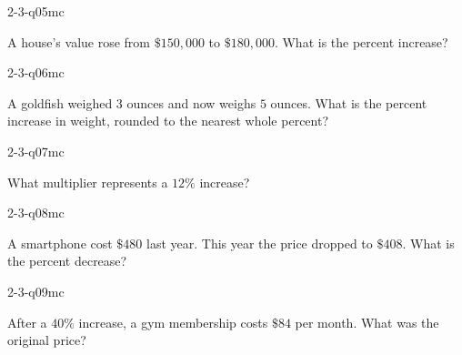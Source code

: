 \begin{practiceQuestion}{2-3-q05}{mc}
\begin{questionText}
A house's value rose from $\$150{,}000$ to $\$180{,}000$. What is the percent increase?
\end{questionText}
\end{practiceQuestion}

\begin{practiceQuestion}{2-3-q06}{mc}
\begin{questionText}
A goldfish weighed $3$ ounces and now weighs $5$ ounces. What is the percent increase in weight, rounded to the nearest whole percent?
\end{questionText}
\end{practiceQuestion}

\begin{practiceQuestion}{2-3-q07}{mc}
\begin{questionText}
What multiplier represents a $12\%$ increase?
\end{questionText}
\end{practiceQuestion}

\begin{practiceQuestion}{2-3-q08}{mc}
\begin{questionText}
A smartphone cost $\$480$ last year. This year the price dropped to $\$408$. What is the percent decrease?
\end{questionText}
\end{practiceQuestion}

\begin{practiceQuestion}{2-3-q09}{mc}
\begin{questionText}
After a $40\%$ increase, a gym membership costs $\$84$ per month. What was the original price?
\end{questionText}
\end{practiceQuestion}

